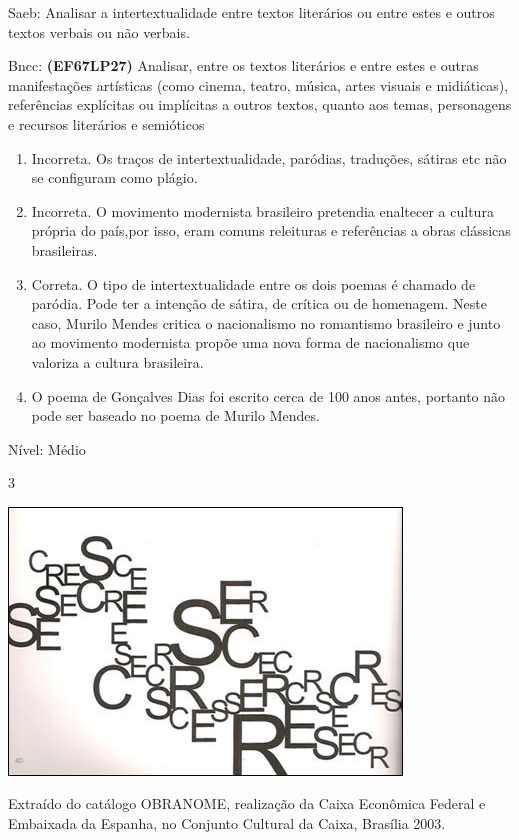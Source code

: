 {{\begin{escolha}
Saeb: Analisar a intertextualidade entre textos literários ou entre
estes e outros textos verbais ou não verbais.

Bncc: \textbf{(EF67LP27)} Analisar, entre os textos literários e entre
estes e outras manifestações artísticas (como cinema, teatro, música,
artes visuais e midiáticas), referências explícitas ou implícitas a
outros textos, quanto aos temas, personagens e recursos literários e
semióticos

\begin{enumerate}
\def\labelenumi{\arabic{enumi}.}
\item
  Incorreta. Os traços de intertextualidade, paródias, traduções,
  sátiras etc não se configuram como plágio.
\item
  Incorreta. O movimento modernista brasileiro pretendia enaltecer a
  cultura própria do país,por isso, eram comuns releituras e referências
  a obras clássicas brasileiras.
\item
  Correta. O tipo de intertextualidade entre os dois poemas é chamado de
  paródia. Pode ter a intenção de sátira, de crítica ou de homenagem.
  Neste caso, Murilo Mendes critica o nacionalismo no romantismo
  brasileiro e junto ao movimento modernista propõe uma nova forma de
  nacionalismo que valoriza a cultura brasileira.
\item
  O poema de Gonçalves Dias foi escrito cerca de 100 anos antes,
  portanto não pode ser baseado no poema de Murilo Mendes.
\end{enumerate}

Nível: Médio

\num{3}

\includegraphics[width=4.11458in,height=2.80208in]{./imgSAEB_7_POR/media/image3.png}

Extraído do catálogo OBRANOME, realização da Caixa Econômica Federal e
Embaixada da Espanha, no Conjunto Cultural da Caixa, Brasília 2003.


\end{escolha}}}
